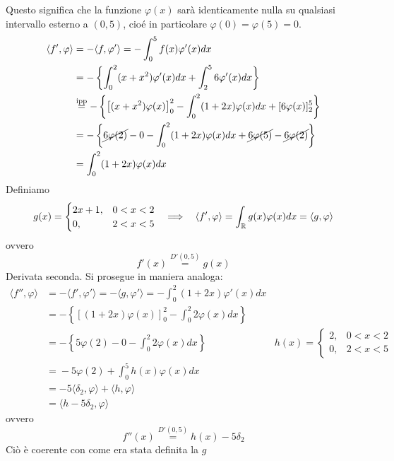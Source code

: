 Questo significa che la funzione $\varphi (x)$ sarà identicamente nulla su qualsiasi intervallo esterno a $(0,5)$, cioé in particolare $\varphi (0) = \varphi (5) = 0$.
\begin{align*}
\langle f',\varphi \rangle  & = - \langle f,\varphi '\rangle = - \int ^{5}_{0} f(x)\varphi '(x)dx\\
 & = - \left\{\int ^{2}_{0} (x + x^{2})\varphi '(x)dx + \int ^{5}_{2} 6\varphi '(x)dx\right\}\\
 & \overset{\text{ipp}}{ = } - \left\{\left[ (x + x^{2})\varphi (x)\right]^{2}_{0} - \int ^{2}_{0} (1 + 2x)\varphi (x)dx + [ 6\varphi (x)]^{5}_{2}\right\}\\
 & = - \left\{\cancel{6\varphi (2)} - 0 - \int ^{2}_{0}(1 + 2x) \varphi (x) dx + \cancel{6\varphi (5)} - \cancel{6\varphi (2)}\right\}\\
 & = \int ^{2}_{0}(1 + 2x) \varphi (x) dx
\end{align*}
Definiamo
\begin{equation*}
g(x) = \begin{cases}
2x + 1, & 0 < x < 2\\
0, & 2 < x < 5
\end{cases} \ \ \implies \ \ \langle f',\varphi \rangle = \int _{\mathbb{R} } g(x) \varphi (x) dx = \langle g,\varphi \rangle 
\end{equation*}
ovvero
\begin{equation*}
f'(x)\overset{D'(0,5)}{ = } g(x)
\end{equation*}
Derivata seconda. Si prosegue in maniera analoga:
\begin{equation*}
\begin{aligned}
\langle f'',\varphi \rangle  & = - \langle f',\varphi '\rangle = - \langle g,\varphi '\rangle = - \int ^{2}_{0} (1 + 2x)\varphi '(x)dx & \\
 & = - \left\{[ (1 + 2x)\varphi (x)]^{2}_{0} - \int ^{2}_{0} 2\varphi (x)dx\right\} & \\
 & = - \left\{5\varphi (2) - 0 - \int ^{2}_{0} 2\varphi (x)dx\right\} & h(x) = \begin{cases}
2, & 0 < x < 2\\
0, & 2 < x < 5
\end{cases}\\
 & \overset{}{ = } - 5\varphi (2) + \int ^{5}_{0} h(x)\varphi (x)dx & \\
 & = - 5\langle \delta _{2} ,\varphi \rangle + \langle h,\varphi \rangle  & \\
 & = \langle h - 5\delta _{2} ,\varphi \rangle  & 
\end{aligned}
\end{equation*}
ovvero
\begin{equation*}
f''(x)\overset{D'(0,5)}{ = } h(x) - 5\delta _{2}
\end{equation*}
Ciò è coerente con come era stata definita la $g$


